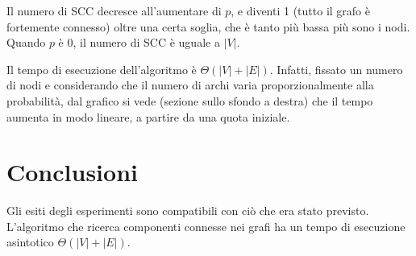 \documentclass[]{article}
\begin{document}
Il numero di SCC decresce all'aumentare di $p$, e diventi 1 (tutto il grafo è fortemente connesso) oltre una certa soglia, che è tanto più bassa più sono i nodi. Quando $p$ è 0, il numero di SCC è uguale a $|V|$.

Il tempo di esecuzione dell'algoritmo è $\Theta(|V|+|E|)$. Infatti, fissato un numero di nodi e considerando che il numero di archi varia proporzionalmente alla probabilità, dal grafico si vede (sezione sullo sfondo a destra) che il tempo aumenta in modo lineare, a partire da una quota iniziale.

\section{Conclusioni}
Gli esiti degli esperimenti sono compatibili con ciò che era stato previsto.
L'algoritmo che ricerca componenti connesse nei grafi ha un tempo di esecuzione asintotico $\Theta(|V|+|E|)$.
\end{document}
